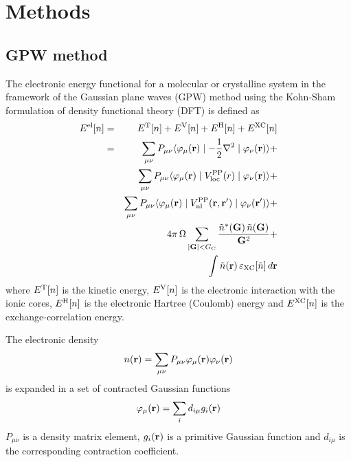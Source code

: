 \documentclass[12pt,twoside,a4paper]{article}
\newcommand{\be}{\begin{equation}}
\newcommand{\ee}{\end{equation}}
\newcommand{\nn}{\nonumber}
\begin{document}
\section{Methods}
%
\subsection{GPW method}
%
The electronic energy functional for a molecular or crystalline system in
the framework of the Gaussian plane waves (GPW) method \cite{GPW} using the
Kohn-Sham formulation of density functional theory (DFT)
\cite{Hohenberg:1964,Kohn:1965} is defined as
\begin{eqnarray}
 \label{GPW-GTH-PP}
 E^{\rm el}[n] &=& E^{\rm T}[n] + E^{\rm V}[n] + E^{\rm H}[n] +
                   E^{\rm XC}[n]\\
               &=& \sum_{\mu\nu} P_{\mu\nu}
                    \langle
                     \varphi_\mu({\bf r})
                     \mid -\frac{1}{2}\nabla^2 \mid
                     \varphi_\nu({\bf r})
                    \rangle +\nn\\
               & & \sum_{\mu\nu} P_{\mu\nu}
                    \langle
                     \varphi_\mu({\bf r})
                     \mid V_{\rm loc}^{\rm PP}(r) \mid
                     \varphi_\nu({\bf r})
                    \rangle +\nn\\
               & & \sum_{\mu\nu} P_{\mu\nu}
                    \langle
                     \varphi_\mu({\bf r})
                     \mid V_{\rm nl}^{\rm PP}({\bf r},{\bf r}^\prime) \mid
                     \varphi_\nu({\bf r}^\prime)
                    \rangle +\nn\\
               & & 4\pi\,\Omega \sum_{|{\bf G}| < G_{\rm C}}
                    \frac{\tilde n^*({\bf G})\,
                          \tilde n({\bf G})}{{\bf G}^2} +\nn\\
               & & \int\tilde n({\bf r})\,\varepsilon_{\rm XC}[\tilde n]\,
                   d{\bf r}\nn
\end{eqnarray}
where $E^{\rm T}[n]$ is the kinetic energy, $E^{\rm V}[n]$ is the electronic
interaction with the ionic cores, $E^{\rm H}[n]$ is the electronic Hartree
(Coulomb) energy and $E^{\rm XC}[n]$ is the exchange-correlation energy.

The electronic density
\be
 n({\bf r}) = \sum_{\mu\nu} P_{\mu\nu}\varphi_\mu({\bf r})\varphi_\nu({\bf r})
\ee
is expanded in a set of contracted Gaussian functions
\be
 \varphi_\mu({\bf r}) = \sum_i d_{i\mu} g_i({\bf r})
\ee
$P_{\mu\nu}$ is a density matrix element, $g_i({\bf r})$ is a primitive
Gaussian function and $d_{i\mu}$ is the corresponding contraction coefficient.
\end{document}
